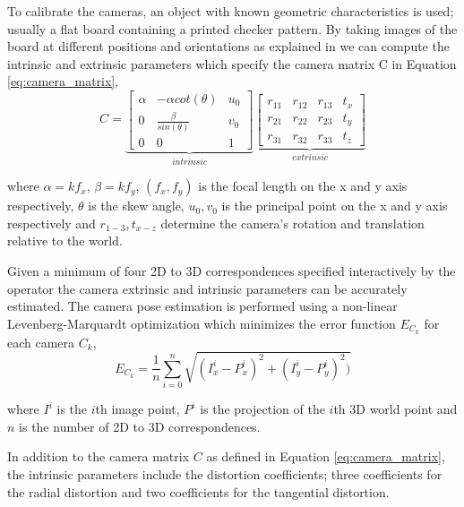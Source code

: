 \documentclass[final,12pt,3p]{elsarticle}
\begin{document}
To calibrate the cameras, an object with known geometric characteristics is used; usually a flat board containing a printed checker pattern. By taking images of the board at different positions and orientations as explained in \cite{zhang2000flexible} we can compute the intrinsic and extrinsic parameters which specify the camera matrix C in Equation \ref{eq:camera_matrix},
\begin{equation}
	C =	
	\underbrace{
		\left[
			\begin{array}{ccc}
				\alpha & -\alpha cot(\theta) & u_{0}\\
				0 & \frac{\beta}{sin(\theta)} & v_{0}\\
				0 & 0 & 1
			\end{array}
		\right]
	}_{intrinsic}
	\underbrace{
		\left[
			\begin{array}{cccc}
				r_{11} & r_{12} & r_{13} & t_{x}\\
				r_{21} & r_{22} & r_{23} & t_{y}\\
				r_{31} & r_{32} & r_{33} & t_{z}
			\end{array}
		\right]
	}_{extrinsic}
	\label{eq:camera_matrix}
\end{equation}

where $\alpha=kf_{x}$, $\beta=kf_{y}$, $(f_{x},f_{y})$ is the focal length on the x and y axis respectively, $\theta$ is the skew angle, $u_{0},v_{0}$ is the principal point on the x and y axis respectively and $r_{1-3}, t_{x-z}$ determine the camera's rotation and translation relative to the world. 

Given a minimum of four 2D to 3D correspondences specified interactively by the operator the camera extrinsic and intrinsic parameters can be accurately estimated. The camera pose estimation is performed using a non-linear Levenberg-Marquardt optimization \cite{opt_1,opt_2} which minimizes the error function $E_{C_{k}}$ for each camera $C_{k}$,
\begin{equation}
	E_{C_{k}} = \frac{1}{n} \sum_{i=0}^n \sqrt{(I_{x}^{i} - P_{x}^{i})^2 + (I_{y}^{i} - P_{y}^{i})^2)}
	\label{eq:minimization_function}
\end{equation}

where $I^{i}$ is the $i$th image point, $P^{i}$ is the projection of the $i$th 3D world point and $n$ is the number of 2D to 3D correspondences. 

In addition to the camera matrix $C$ as defined in Equation \ref{eq:camera_matrix}, the intrinsic parameters include the distortion coefficients; three coefficients for the radial distortion and two coefficients for the tangential distortion. 
\end{document}
